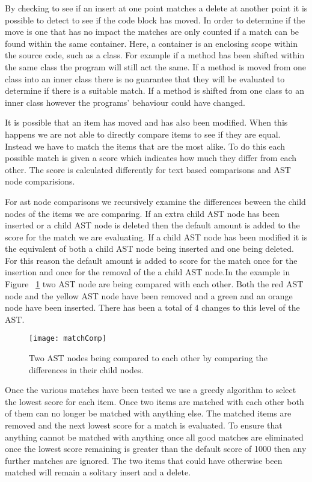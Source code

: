 By checking to see if an insert at one point matches a delete at another point it is possible to detect to see if the code block has moved. In order to determine if the move is one that has no impact the matches are only counted if a match can be found within the same container.  Here, a container is an enclosing scope within the source code, such as a class. For example if a method has been shifted within the same class the program will still act the same.  If a method is moved from one class into an inner class there is no guarantee that they will be evaluated to determine if there is a suitable match.  If a method is shifted from one class to an inner class however the programs' behaviour could have changed.

It is possible that an item has moved and has also been modified.  When this happens we are not able to directly compare items to see if they are equal.  Instead we have to match the items that are the most alike.   
To do this each possible match is given a score which indicates how much they differ from each other.  The score is calculated differently for text based comparisons and AST node comparisions.  

For ast node comparisons we recursively examine the differences beween the child nodes of the items we are comparing.  If an extra child AST node has been inserted or a child AST node is deleted then the default amount is added to the score for the match we are evaluating. If a child AST node has been modified it is the equivalent of both a child AST node being inserted and one being deleted. For this reason the default amount is added to score for the match once for the insertion and once for the removal of the a child AST node.In the example in Figure ~\ref{fig:matchComp} two AST node are being compared with each other. Both the red AST node and the yellow AST node have been removed and a green and an orange node have been inserted.  There has been a total of 4 changes to this level of the AST. 


\begin{figure}[!t]
 \begin{center}
 \texttt{[image: matchComp]}
 \end{center}
 \caption{Two AST nodes being compared to each other by comparing the differences in their child nodes.}
 \label{fig:matchComp}
\end{figure}


Once the various matches have been tested we use a greedy algorithm to select the lowest score for each item.  Once two items are matched with each other both of them can no longer be matched with anything else. The matched items are removed and the next lowest score for a match is evaluated.  To ensure that anything cannot be matched with anything once all good matches are eliminated once the lowest score remaining is greater than the default score of 1000 then any further matches are ignored.  The two items that could have otherwise been matched will remain a solitary insert and a delete.

